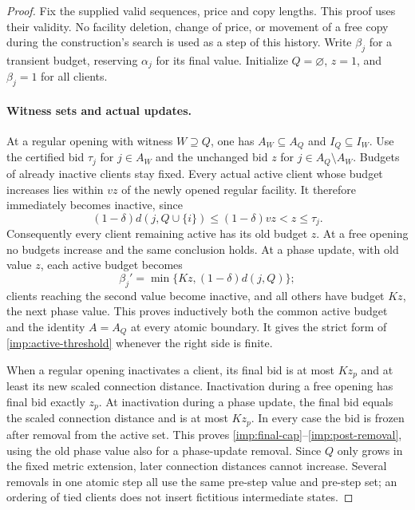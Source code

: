 \begin{proof}
Fix the supplied valid sequences, price and copy lengths. This proof
uses their validity. No facility deletion, change of price, or movement
of a free copy during the construction's search is used as a step of
this history. Write $\beta_j$ for
a transient budget, reserving $\alpha_j$ for its final value.
Initialize $Q=\varnothing$, $z=1$, and $\beta_j=1$ for all clients.

\paragraph{Witness sets and actual updates.}
At a regular opening with witness $W\supseteq Q$, one has
$A_W\subseteq A_Q$ and $I_Q\subseteq I_W$.  Use the certified bid
$\tau_j$ for $j\in A_W$ and the unchanged bid $z$ for
$j\in A_Q\setminus A_W$.  Budgets of already inactive clients stay
fixed.  Every actual active client whose budget increases lies within
$vz$ of the newly opened regular facility.  It therefore immediately
becomes inactive, since
\[
 (1-\delta)d(j,Q\cup\{i\})
     \le(1-\delta)vz<z\le\tau_j.
\]
Consequently every client remaining active has its old budget $z$.
At a free opening no budgets increase and the same conclusion holds.
At a phase update, with old value $z$, each active budget becomes
\[
 \beta_j'=\min\{Kz,(1-\delta)d(j,Q)\};
\]
clients reaching the second value become inactive, and all others
have budget $Kz$, the next phase value.  This proves inductively both
the common active budget and the identity $A=A_Q$ at every atomic
boundary.  It gives the strict form of
\eqref{imp:active-threshold} whenever the right side is finite.

When a regular opening inactivates a client, its final bid is at most
$Kz_p$ and at least its new scaled connection distance. Inactivation
during a free opening has final bid exactly $z_p$. At inactivation
during a phase update, the final bid equals the scaled connection
distance and is at most $Kz_p$. In every case the bid is frozen
after removal from the active set.
This proves \eqref{imp:final-cap}--\eqref{imp:post-removal}, using
the old phase value also for a phase-update removal.
Since $Q$ only grows in the fixed metric extension, later connection
distances cannot increase.  Several removals in one atomic step all
use the same pre-step value and pre-step set; an ordering of tied
clients does not insert fictitious intermediate states.


\end{proof}
